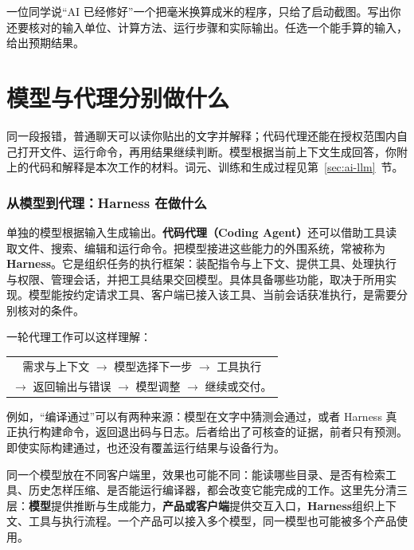 \begin{exercise}\label{ex:ai-principle-responsibility}
一位同学说“AI 已经修好”一个把毫米换算成米的程序，只给了启动截图。写出你还要核对的输入单位、计算方法、运行步骤和实际输出。任选一个能手算的输入，给出预期结果。
\end{exercise}

\section{模型与代理分别做什么}
\label{sec:ai-model-agent}

同一段报错，普通聊天可以读你贴出的文字并解释；代码代理还能在授权范围内自己打开文件、运行命令，再用结果继续判断。模型根据当前上下文生成回答，你附上的代码和解释是本次工作的材料。词元、训练和生成过程见第~\ref{sec:ai-llm}~节。

\subsubsection{从模型到代理：Harness 在做什么}

单独的模型根据输入生成输出。\textbf{代码代理（Coding Agent）}还可以借助工具读取文件、搜索、编辑和运行命令。把模型接进这些能力的外围系统，常被称为 \textbf{Harness}。它是组织任务的执行框架：装配指令与上下文、提供工具、处理执行与权限、管理会话，并把工具结果交回模型。具体具备哪些功能，取决于所用实现。模型能按约定请求工具、客户端已接入该工具、当前会话获准执行，是需要分别核对的条件。

一轮代理工作可以这样理解：
\begin{center}
\begin{tabular}{c}
需求与上下文 $\longrightarrow$ 模型选择下一步 $\longrightarrow$ 工具执行\\[3pt]
$\longrightarrow$ 返回输出与错误 $\longrightarrow$ 模型调整 $\longrightarrow$ 继续或交付。
\end{tabular}
\end{center}
例如，“编译通过”可以有两种来源：模型在文字中猜测会通过，或者 Harness 真正执行构建命令，返回退出码与日志。后者给出了可核查的证据，前者只有预测。即使实际构建通过，也还没有覆盖运行结果与设备行为。

同一个模型放在不同客户端里，效果也可能不同：能读哪些目录、是否有检索工具、历史怎样压缩、是否能运行编译器，都会改变它能完成的工作。这里先分清三层：\textbf{模型}提供推断与生成能力，\textbf{产品或客户端}提供交互入口，\textbf{Harness}组织上下文、工具与执行流程。一个产品可以接入多个模型，同一模型也可能被多个产品使用。

